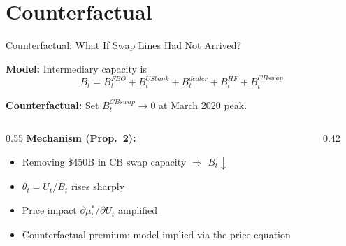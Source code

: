 \documentclass[aspectratio=169, 10pt]{beamer}
\newcommand{\mustar}{\mu_t^{*}}      %
\newcommand{\thetaT}{\theta_t}       %
\newcommand{\Bt}{B_t}                %
\newcommand{\Ut}{U_t}                %
\begin{document}
\section{Counterfactual}

\begin{frame}{Counterfactual: What If Swap Lines Had Not Arrived?}

  \textbf{Model:} Intermediary capacity is
  \[
    \Bt = B_t^{FBO} + B_t^{USbank} + B_t^{dealer} + B_t^{HF} + B_t^{CBswap}
  \]

  \textbf{Counterfactual:} Set $B_t^{CBswap} \to 0$ at March 2020 peak.

  \bigskip

  \begin{columns}
    \begin{column}{0.55\textwidth}
      \textbf{Mechanism (Prop.~2):}
      \begin{itemize}
        \item Removing \$450B in CB swap capacity $\Rightarrow$ $\Bt \downarrow$
        \item $\thetaT = \Ut/\Bt$ rises sharply
        \item Price impact $\partial\mustar/\partial\Ut$ amplified
        \item Counterfactual premium: model-implied via the price equation
      \end{itemize}
    \end{column}
    \begin{column}{0.42\textwidth}
    \end{column}
  \end{columns}


\end{frame}
\end{document}

